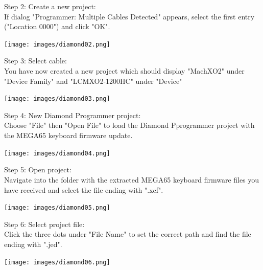 \vspace{5mm}

\begin{minipage}{\linewidth}
Step 2: Create a new project: \\
If dialog "Programmer: Multiple Cables Detected" appears,
select the first entry ("Location 0000") and click "OK".
  \begin{center}
  \texttt{[image: images/diamond02.png]}
  \end{center}
\end{minipage}


\begin{minipage}{\linewidth}
Step 3: Select cable: \\
You have now created a new project which should display
"MachXO2" under "Device Family" and "LCMXO2-1200HC" under "Device"
  \begin{center}
  \texttt{[image: images/diamond03.png]}
  \end{center}
\end{minipage}

\vspace{5mm}

\begin{minipage}{\linewidth}
Step 4: New Diamond Programmer project: \\
Choose "File" then "Open File" to load the Diamond Pprogrammer
project with the MEGA65 keyboard firmware update.
  \begin{center}
  \texttt{[image: images/diamond04.png]}
  \end{center}
\end{minipage}


\begin{minipage}{\linewidth}
Step 5: Open project: \\
Navigate into the folder with the extracted MEGA65 keyboard
firmware files you have received and select the file ending with ".xcf".
  \begin{center}
  \texttt{[image: images/diamond05.png]}
  \end{center}
\end{minipage}

\vspace{5mm}

\begin{minipage}{\linewidth}
Step 6: Select project file: \\
Click the three dots under "File Name" to set the correct
path and find the file ending with ".jed".
  \begin{center}
  \texttt{[image: images/diamond06.png]}
  \end{center}
\end{minipage}


